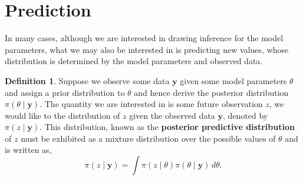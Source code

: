 \documentclass[
]{book}
\theoremstyle{definition}
\newtheorem{definition}{Definition}[chapter]
\theoremstyle{definition}
\theoremstyle{definition}
\theoremstyle{definition}
\theoremstyle{remark}
\begin{document}
\hypertarget{prediction}{%
\section{Prediction}\label{prediction}}

In many cases, although we are interested in drawing inference for the model parameters, what we may also be interested in is predicting new values, whose distribution is determined by the model parameters and observed data.

\begin{definition}
Suppose we observe some data \(\boldsymbol{y}\) given some model parameters \(\theta\) and assign a prior distribution to \(\theta\) and hence derive the posterior distribution \(\pi(\theta \mid \boldsymbol{y})\). The quantity we are interested in is some future observation \(z\), we would like to the distribution of \(z\) given the observed data \(\boldsymbol{y}\), denoted by \(\pi(z \mid \boldsymbol{y})\). This distribution, known as the \textbf{posterior predictive distribution} of \(z\) must be exhibited as a mixture distribution over the possible values of \(\theta\) and is written as,
\[
\pi(z \mid \boldsymbol{y}) = \int \pi(z \mid \theta) \pi(\theta \mid \boldsymbol{y})\, d\theta.
\]
\end{definition}
\end{document}
